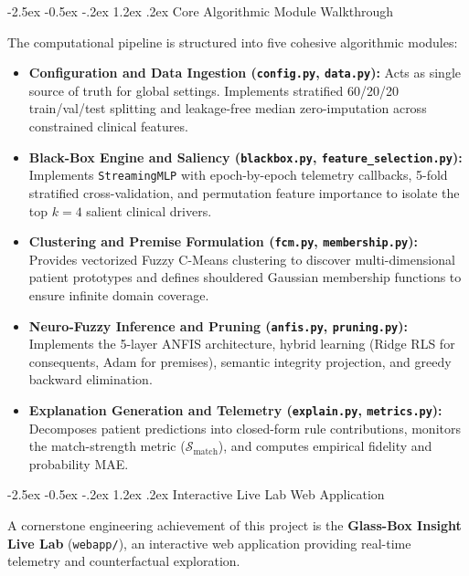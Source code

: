 \documentclass[12pt,a4paper,oneside]{report}
\makeatletter
\renewcommand\section{\@startsection {section}{1}{\z@}%
                                   {-2.5ex \@plus -0.5ex \@minus -.2ex}%
                                   {1.2ex \@plus .2ex}%
                                   {\normalfont\fontsize{13}{16}\selectfont\bfseries}}
\makeatother
\begin{document}
\section{Core Algorithmic Module Walkthrough}

The computational pipeline is structured into five cohesive algorithmic modules:
\begin{itemize}
    \setlength{\itemsep}{0pt}
    \setlength{\parskip}{0pt}
    \item \textbf{Configuration and Data Ingestion (\texttt{config.py}, \texttt{data.py}):} Acts as single source of truth for global settings. Implements stratified 60/20/20 train/val/test splitting and leakage-free median zero-imputation across constrained clinical features.
    \item \textbf{Black-Box Engine and Saliency (\texttt{blackbox.py}, \texttt{feature\_selection.py}):} Implements \texttt{StreamingMLP} with epoch-by-epoch telemetry callbacks, 5-fold stratified cross-validation, and permutation feature importance to isolate the top $k=4$ salient clinical drivers.
    \item \textbf{Clustering and Premise Formulation (\texttt{fcm.py}, \texttt{membership.py}):} Provides vectorized Fuzzy C-Means clustering to discover multi-dimensional patient prototypes and defines shouldered Gaussian membership functions to ensure infinite domain coverage.
    \item \textbf{Neuro-Fuzzy Inference and Pruning (\texttt{anfis.py}, \texttt{pruning.py}):} Implements the 5-layer ANFIS architecture, hybrid learning (Ridge RLS for consequents, Adam for premises), semantic integrity projection, and greedy backward elimination.
    \item \textbf{Explanation Generation and Telemetry (\texttt{explain.py}, \texttt{metrics.py}):} Decomposes patient predictions into closed-form rule contributions, monitors the match-strength metric ($\mathcal{S}_{\text{match}}$), and computes empirical fidelity and probability MAE.
\end{itemize}

\section{Interactive Live Lab Web Application}

A cornerstone engineering achievement of this project is the \textbf{Glass-Box Insight Live Lab} (\texttt{webapp/}), an interactive web application providing real-time telemetry and counterfactual exploration.
\end{document}
